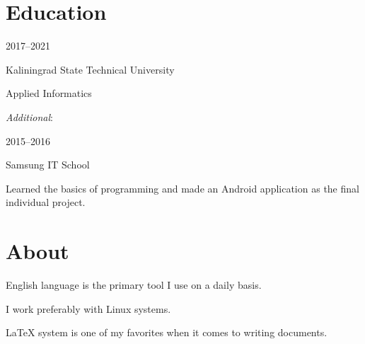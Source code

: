 \documentclass [12pt] {article}
\begin{document}
\section {Education}

2017--2021

Kaliningrad State Technical University

Applied Informatics

\bigskip

\emph {Additional}:

2015--2016

Samsung IT School

Learned the basics of programming and
made an Android application as the final individual project.

\section {About}

English language is the primary tool I use on a daily basis.

I work preferably with Linux systems.

LaTeX system is one of my favorites when it comes to writing documents.
\end{document}
